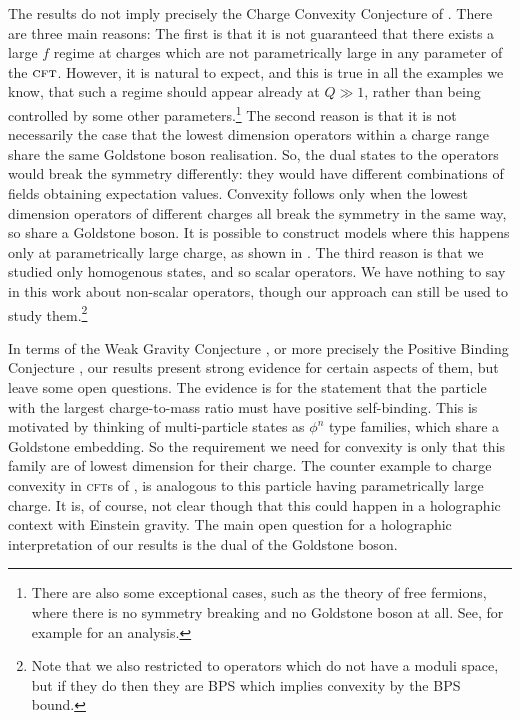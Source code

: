 \documentclass[11pt]{article}
\numberwithin{equation}{section}
\begin{document}
The results do not imply precisely the Charge Convexity Conjecture of \cite{Aharony:2021mpc}. There are three main reasons: The first is that it is not guaranteed that there exists a large $f$ regime at charges which are not parametrically large in any parameter of the $\textsc{cft}$. However, it is natural to expect, and this is true in all the examples we know, that such a regime should appear already at $Q \gg 1$, rather than being controlled by some other parameters.\footnote{There are also some exceptional cases, such as the theory of free fermions, where there is no symmetry breaking and no Goldstone boson at all. See, for example \cite{Komargodski:2021zzy} for an analysis.} The second reason is that it is not necessarily the case that the lowest dimension operators within a charge range share the same Goldstone boson realisation. So, the dual states to the operators would break the symmetry differently: they would have different combinations of fields obtaining expectation values. Convexity follows only when the lowest dimension operators of different charges all break the symmetry in the same way, so share a Goldstone boson. It is possible to construct models where this happens only at parametrically large charge, as shown in \cite{Sharon:2023drx}. 
The third reason is that we studied only homogenous states, and so scalar operators. We have nothing to say in this work about non-scalar operators, though our approach can still be used to study them.\footnote{Note that we also restricted to operators which do not have a moduli space, but if they do then they are BPS which implies convexity by the BPS bound.}   

In terms of the Weak Gravity Conjecture \cite{Arkani-Hamed:2006emk}, or more precisely the Positive Binding Conjecture \cite{Aharony:2021mpc}, our results present strong evidence for certain aspects of them, but leave some open questions. The evidence is for the statement that the particle with the largest charge-to-mass ratio must have positive self-binding. This is motivated by thinking of multi-particle states as $\phi^n$ type families, which share a Goldstone embedding. So the requirement we need for convexity is only that this family are of lowest dimension for their charge. The counter example to charge convexity in \textsc{cft}s of \cite{Sharon:2023drx}, is analogous to this particle having parametrically large charge. It is, of course, not clear though that this could happen in a holographic context with Einstein gravity. The main open question for a holographic interpretation of our results is the dual of the Goldstone boson. 
\end{document}
